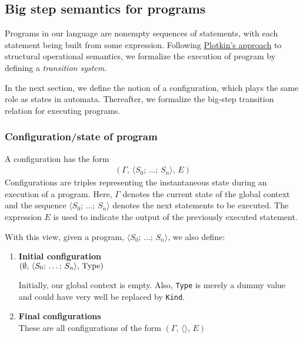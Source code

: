 \documentclass{article}
\begin{document}

\subsection{Big step semantics for programs}
\begin{comment}
  Follows this approach:
  https://www.cs.cornell.edu/courses/cs6110/2013sp/lectures/lec05-sp13.pdf
\end{comment}

Programs in our language are nonempty sequences of statements, with each
statement being built from some expression.
Following \href{https://web.eecs.umich.edu/~weimerw/2014-6610/reading/plotkin81structural.pdf}
{Plotkin's approach} to structural operational semantics, we formalize
the execution of program by defining a \textit{transition system}.

In the next section, we define the notion of a configuration, which plays the
same role as states in automata. Thereafter, we formalize the big-step 
transition relation for executing programs.

\subsubsection{Configuration/state of program}
A configuration has the form
\begin{align*}
  (\Gamma, \, \langle S_0; \, \dots; \, S_n \rangle, \, E)
\end{align*}
Configurations are triples representing the instantaneous state during an
execution of a program. Here, $\Gamma$ denotes the current state of the
global context and the sequence $\langle S_0; \, \dots; \, S_n \rangle$ denotes
the next statements to be executed. 
The expression $E$ is used to indicate the output of the previously executed
statement.

With this view, given a program, $\langle S_0; \, \dots; \, S_n
\rangle$, we also define:
\begin{enumerate}
\item \textbf{Initial configuration} \\
  $ (\emptyset, \, \langle S_0; \, \dots; \, S_n \rangle, \, \operatorname{Type})$

  Initially, our global context is empty. Also, \verb|Type| is merely a dummy
  value and could have very well be replaced by \verb|Kind|.

\item \textbf{Final configurations} \\
  These are all configurations of the form
  $(\Gamma, \, \langle \rangle, \, E)$
\end{enumerate}
\end{document}
